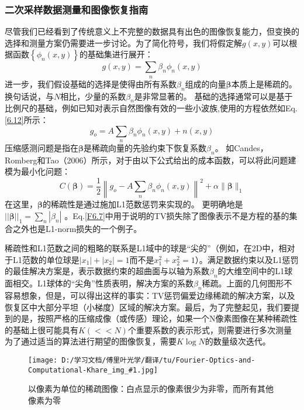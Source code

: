 \documentclass[12pt, UTF8]{ctexart}%
\numberwithin{equation}{section}
\numberwithin{figure}{section}
\newcommand {\InsertPic}[3]{\begin{figure}[htbp]\centering \texttt{[image: D:/学习文档/傅里叶光学/翻译/tu/Fourier-Optics-and-Computational-Khare\_img\_\#1.jpg]}\caption{#3}  \label{#2}\end{figure}}%
\newcommand{\InsertEqution}[2]{\begin{equation}
  \label{#1}
   #2
 \end{equation}}
\newcommand{\RefEq}[1]{Eq.\ref{#1}}
\newcommand{\InsertInlineEq}[1]{$#1$}
\begin{document}
\begin{sloppypar}
\subsubsection{二次采样数据测量和图像恢复指南}
尽管我们已经看到了传统意义上不完整的数据具有出色的图像恢复能力，但变换的选择和测量方案仍需要进一步讨论。为了简化符号，我们将假定解\InsertInlineEq{g(x,y)}可以根据函数\InsertInlineEq{\left\{\phi_{n}(x, y)\right\}}的基础集进行展开：
\InsertEqution{6.25}{g(x, y)=\sum_{n} \beta_{n} \phi_{n}(x, y)}
进一步，我们假设基础的选择是使得由所有系数\InsertInlineEq{\beta_n}组成的向量\InsertInlineEq{\boldsymbol{\beta}}本质上是稀疏的。 换句话说，与\InsertInlineEq{N}相比，少量的系数\InsertInlineEq{\beta_n}是非常显著的。 基础的选择通常可以是基于比例尺的基础，例如已知对表示自然图像有效的一些小波族,使用的方程依然如\RefEq{6.12}所示：
\InsertEqution{6.26}{g_{o}=A \sum_{n} \beta_{n} \phi_{n}(x, y)+n(x, y)}
压缩感测问题是指在\InsertInlineEq{\boldsymbol{\beta}}是稀疏向量的先验约束下恢复系数\InsertInlineEq{\beta_n}。 如Candes，Romberg和Tao（2006）所示，对于由以下公式给出的成本函数，可以将此问题建模为最小化问题：
\InsertEqution{6.27}{C(\boldsymbol{\beta})=\frac{1}{2}\left\|g_{o}-A \sum_{n} \beta_{n} \phi_{n}(x, y)\right\|^{2}+\alpha\|\boldsymbol{\beta}\|_{1}}
在这里，\InsertInlineEq{\boldsymbol{\beta}}的稀疏性是通过施加L1范数惩罚来实现的。 更明确地是\InsertInlineEq{||\boldsymbol{\beta}||_1=\sum_n |\beta_n|} 。\RefEq{F6.7}中用于说明的TV损失除了图像表示不是方程的基的集合之外也是L1-norm损失的一个例子。

稀疏性和L1范数之间的粗略的联系是L1域中的球是“尖的”（例如，在2D中，相对于L1范数的单位球是\InsertInlineEq{|x_1|+|x_2|=1}而不是\InsertInlineEq{x^2_1+x^2_2=1}）。满足数据约束以及L1惩罚的最佳解决方案是，表示数据约束的超曲面与以轴为系数\InsertInlineEq{\beta_n}的大维空间中的L1球面相交。L1球体的“尖角”性质表明，解决方案的系数\InsertInlineEq{\beta_n}稀疏。上面的几何图形不容易想象，但是，可以得出这样的事实：TV惩罚偏爱边缘稀疏的解决方案，以及恢复区中大部分平坦（小梯度）区域的解决方案。最后，为了完整起见，我们要提到的是，按照严格的压缩成像（或传感）理论，如果一个N像素图像在某种稀疏性的基础上很可能具有\InsertInlineEq{K(<<N)}个重要系数的表示形式，则需要进行多次测量为了通过适当的算法进行期望的图像恢复，需要\InsertInlineEq{K \log N}的数量级次迭代。
\InsertPic{30}{F6.8}{以像素为单位的稀疏图像：白点显示的像素很少为非零，而所有其他像素为零}


\end{sloppypar}
\end{document}
